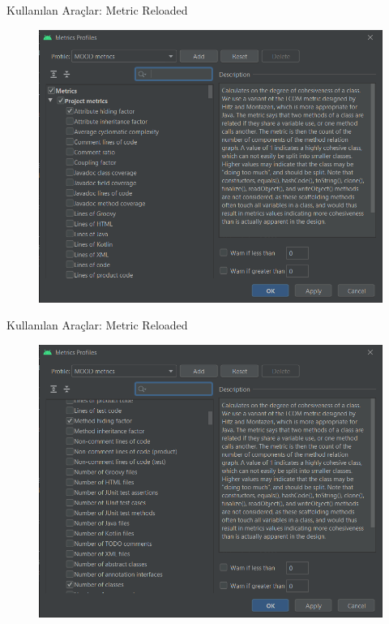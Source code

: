 \documentclass[compress,xcolor=table]{beamer}
\begin{document}
\begin{frame}{Kullanılan Araçlar: Metric Reloaded}
\begin{figure}
\vspace{-.8cm}
   \includegraphics[width = \textwidth, height = 7.4 cm]{QMOODimage/android-metrik-1.png}
\end{figure}
\end{frame}
\begin{frame}{Kullanılan Araçlar: Metric Reloaded}
\begin{figure}
\vspace{-.8cm}
   \includegraphics[width = \textwidth, height = 7.4 cm]{QMOODimage/android-metrik-2.png}
\end{figure}
\end{frame}
\end{document}
